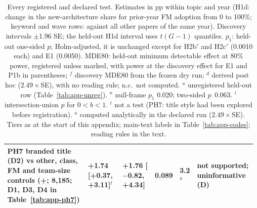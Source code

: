 \begin{table}[p]
\begin{tabularx}{\textwidth}{@{}>{\raggedright\arraybackslash}X l l l l >{\raggedright\arraybackslash}p{2.45cm}@{}}
PH7 branded title (D2) vs other, class, FM and team-size controls (+; 8,185; D1, D3, D4 in Table~\ref{tab:app-ph7}) & +1.74 [+0.37, +3.11]$^t$ & +1.76 [$-$0.82, +4.34] & 0.089 & 3.2$^a$ & not supported; uninformative (D) \\
\bottomrule
\end{tabularx}
\caption{Every registered and declared test. Estimates in pp within topic and year (H1d: change in the
new-architecture share for prior-year FM adoption from 0 to 100\%; keyword and wave rows: against all other papers of
the same year). Discovery intervals $\pm$1.96 SE; the held-out H1d interval uses $t(G-1)$ quantiles. $p_1$: held-out
one-sided $p$; Holm-adjusted, it is unchanged except for H2b$'$ and H2c$'$ (0.0010 each) and E1 (0.0050). MDE80:
held-out minimum detectable effect at 80\% power, registered unless marked, with power at the discovery effect for E1
and P1b in parentheses; $^f$ discovery MDE80 from the frozen dry run; $^d$ derived post hoc ($2.49\times$SE), with
no reading rule; n.c.\ not computed. $^u$ unregistered held-out row (Table~\ref{tab:app-unreg}). $^n$ null-frame
$p_1$ 0.020; two-sided $p$~0.063. $^i$ intersection-union $p$ for $0<b<1$. $^t$ not a test (PH7: title style had
been explored before registration). $^a$ computed analytically in the declared run ($2.49\times$SE). Tiers as at
the start of this appendix; main-text labels in Table~\ref{tab:app-codes}; reading rules in the text.}
\label{tab:app-tests}
\end{table}

